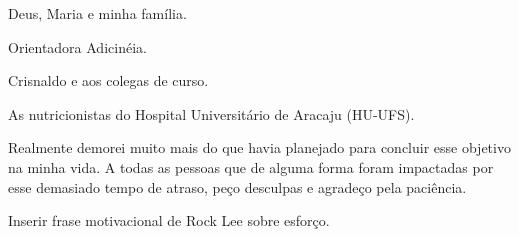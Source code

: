 \begin{agradecimentos}

Deus, Maria e minha família.

Orientadora Adicinéia.

Crisnaldo e aos colegas de curso.

As nutricionistas do Hospital Universitário de Aracaju (HU-UFS).

Realmente demorei muito mais do que havia planejado para concluir esse objetivo na minha vida. A todas as pessoas que de alguma forma foram impactadas por esse demasiado tempo de atraso, peço desculpas e agradeço pela paciência. 

Inserir frase motivacional de Rock Lee sobre esforço.


\end{agradecimentos}
